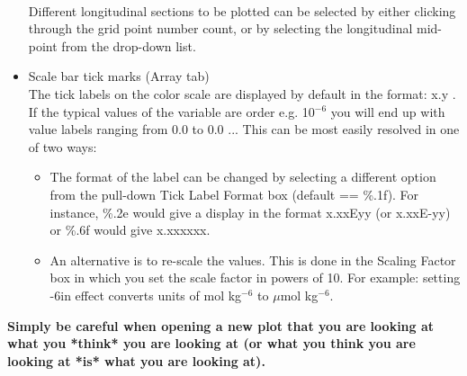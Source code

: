 \documentclass[11pt,fleqn]{book} %
\begin{document}
\begin{itemize}
        \\ Different longitudinal sections to be plotted can be selected by either clicking through the grid point number count, or by selecting the longitudinal mid-point from the drop-down list.
\item Scale bar tick marks (\footnotesize\textsf{Array }\normalsize tab)
        \\ The tick labels on the color scale are displayed by default in the format: \footnotesize\textsf{x.y }\normalsize. If the typical values of the variable are order e.g. 10\begin{math}^{-6}\end{math} you will end up with value labels ranging from \footnotesize\textsf{0.0 }\normalsize to \footnotesize\textsf{0.0 }\normalsize ... This can be most easily resolved in one of two ways:
        
\begin{itemize}
\item The format of the label can be changed by selecting a different option from the pull-down \footnotesize\textsf{Tick Label Format }\normalsize box (default == \footnotesize\textsf{\%.1f}\normalsize). For instance, \footnotesize\textsf{\%.2e }\normalsize would give a display in the format \footnotesize\textsf{x.xxEyy }\normalsize (or \footnotesize\textsf{x.xxE-yy}\normalsize) or \footnotesize\textsf{\%.6f }\normalsize would give \footnotesize\textsf{x.xxxxxx}\normalsize.
\item An alternative is to re-scale the values. This is done in the Scaling Factor box in which you set the scale factor in powers of 10. For example: setting \footnotesize\textsf{-6}\normalsize in effect converts units of mol kg\begin{math}^{-6}\end{math} to \begin{math}\mu\end{math}mol kg\begin{math}^{-6}\end{math}.
\end{itemize}

\end{itemize}

\begin{center}
\textbf{Simply be careful when opening a new plot that you are looking at what you *think* you are looking at (or what you think you are looking at *is* what you are looking at).}
\end{center}
\end{document}
